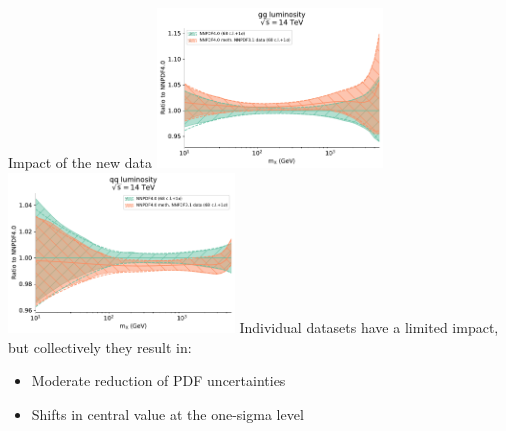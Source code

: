 \documentclass[aspectratio=169,9pt]{beamer}
\begin{document}
\begin{frame}[t]{Impact of the new data}
	\includegraphics[width=0.45\textwidth]{lumi1d_gg_NNPDF40meth_NNPDF31data}
	\includegraphics[width=0.45\textwidth]{lumi1d_qq_NNPDF40meth_NNPDF31data}
	Individual datasets have a limited impact, but collectively they result in:
	\begin{itemize}
	    \item Moderate reduction of PDF uncertainties
	    \item Shifts in central value at the one-sigma level
	\end{itemize}
\end{frame}
\end{document}
